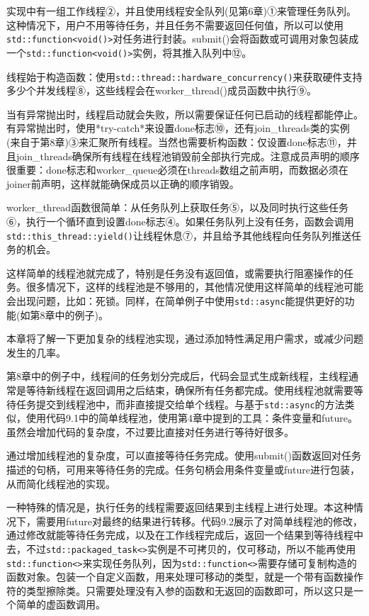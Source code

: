 实现中有一组工作线程②，并且使用线程安全队列(见第6章)①来管理任务队列。这种情况下，用户不用等待任务，并且任务不需要返回任何值，所以可以使用\texttt{std::function<void()>}对任务进行封装。submit()会将函数或可调用对象包装成一个\texttt{std::function<void()>}实例，将其推入队列中⑫。

线程始于构造函数：使用\texttt{std::thread::hardware\_concurrency()}来获取硬件支持多少个并发线程⑧，这些线程会在worker\_thread()成员函数中执行⑨。

当有异常抛出时，线程启动就会失败，所以需要保证任何已启动的线程都能停止。有异常抛出时，使用*try-catch*来设置done标志⑩，还有join\_threads类的实例(来自于第8章)③来汇聚所有线程。当然也需要析构函数：仅设置done标志⑪，并且join\_threads确保所有线程在线程池销毁前全部执行完成。注意成员声明的顺序很重要：done标志和worker\_queue必须在threads数组之前声明，而数据必须在joiner前声明，这样就能确保成员以正确的顺序销毁。

worker\_thread函数很简单：从任务队列上获取任务⑤，以及同时执行这些任务⑥，执行一个循环直到设置done标志④。如果任务队列上没有任务，函数会调用\texttt{std::this\_thread::yield()}让线程休息⑦，并且给予其他线程向任务队列推送任务的机会。

这样简单的线程池就完成了，特别是任务没有返回值，或需要执行阻塞操作的任务。很多情况下，这样的线程池是不够用的，其他情况使用这样简单的线程池可能会出现问题，比如：死锁。同样，在简单例子中使用\texttt{std::async}能提供更好的功能(如第8章中的例子)。

本章将了解一下更加复杂的线程池实现，通过添加特性满足用户需求，或减少问题发生的几率。


第8章中的例子中，线程间的任务划分完成后，代码会显式生成新线程，主线程通常是等待新线程在返回调用之后结束，确保所有任务都完成。使用线程池就需要等待任务提交到线程池中，而非直接提交给单个线程。与基于\texttt{std::async}的方法类似，使用代码9.1中的简单线程池，使用第4章中提到的工具：条件变量和future。虽然会增加代码的复杂度，不过要比直接对任务进行等待好很多。

通过增加线程池的复杂度，可以直接等待任务完成。使用submit()函数返回对任务描述的句柄，可用来等待任务的完成。任务句柄会用条件变量或future进行包装，从而简化线程池的实现。

一种特殊的情况是，执行任务的线程需要返回结果到主线程上进行处理。本这种情况下，需要用future对最终的结果进行转移。代码9.2展示了对简单线程池的修改，通过修改就能等待任务完成，以及在工作线程完成后，返回一个结果到等待线程中去，不过\texttt{std::packaged\_task<>}实例是不可拷贝的，仅可移动，所以不能再使用\texttt{std::function<>}来实现任务队列，因为\texttt{std::function<>}需要存储可复制构造的函数对象。包装一个自定义函数，用来处理可移动的类型，就是一个带有函数操作符的类型擦除类。只需要处理没有入参的函数和无返回的函数即可，所以这只是一个简单的虚函数调用。

